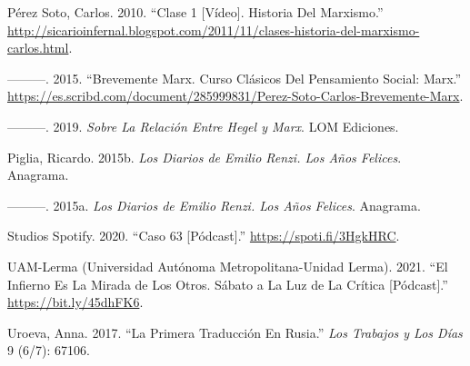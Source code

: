 \documentclass[
]{interact}
\newlength{\cslhangindent}
\newenvironment{CSLReferences}[2] %
 {\begin{list}{}{%
  \setlength{\itemindent}{0pt}
  \setlength{\leftmargin}{0pt}
  \setlength{\parsep}{0pt}
  \ifodd #1
   \setlength{\leftmargin}{\cslhangindent}
   \setlength{\itemindent}{-1\cslhangindent}
  \fi
  \setlength{\itemsep}{#2\baselineskip}}}
 {\end{list}}
\begin{document}
\begin{CSLReferences}{1}{0}
Pérez Soto, Carlos. 2010. {``Clase 1 {[}Vídeo{]}. Historia Del
Marxismo.''}
\url{http://sicarioinfernal.blogspot.com/2011/11/clases-historia-del-marxismo-carlos.html}.

---------. 2015. {``Brevemente Marx. Curso Clásicos Del Pensamiento
Social: Marx.''}
\url{https://es.scribd.com/document/285999831/Perez-Soto-Carlos-Brevemente-Marx}.

---------. 2019. \emph{Sobre La Relación Entre Hegel y Marx}. LOM
Ediciones.

Piglia, Ricardo. 2015b. \emph{Los Diarios de Emilio Renzi. Los Años
Felices}. Anagrama.

---------. 2015a. \emph{Los Diarios de Emilio Renzi. Los Años Felices}.
Anagrama.

Studios Spotify. 2020. {``Caso 63 {[}Pódcast{]}.''}
\url{https://spoti.fi/3HgkHRC}.

UAM-Lerma (Universidad Autónoma Metropolitana-Unidad Lerma). 2021. {``El
Infierno Es La Mirada de Los Otros. Sábato a La Luz de La Crítica
{[}Pódcast{]}.''} \url{https://bit.ly/45dhFK6}.

Uroeva, Anna. 2017. {``La Primera Traducción En Rusia.''} \emph{Los
Trabajos y Los Días} 9 (6/7): 67106.

\end{CSLReferences}
\end{document}
